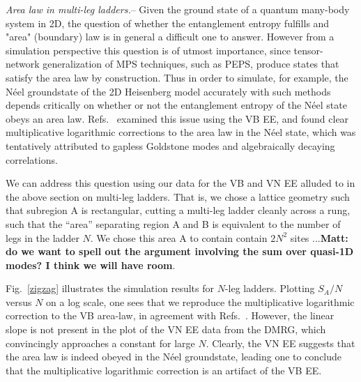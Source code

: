 \documentclass[prl,aps,twocolumn,floatfix,amsmath,amssymb,superscriptaddress,tightenlines]{revtex4}
\begin{document}
{\it Area law in multi-leg ladders.}--  Given the ground state of a
quantum many-body system in 2D, the question of whether the entanglement
entropy fulfills and "area" (boundary) law is in general a difficult one
to answer.  However from a simulation perspective this question is of
utmost importance, since tensor-network generalization of MPS techniques,
such as PEPS, produce states that satisfy the area law by construction.
Thus in order to simulate, for example, the N\'eel groundstate of the 2D
Heisenberg model accurately with such methods depends critically on
whether or not the entanglement entropy of the N\'eel state obeys an area
law.  Refs.~\cite{Alet,Chh} examined this issue using the VB EE, and found
clear multiplicative logarithmic corrections to the area law in the N\'eel
state, which was tentatively attributed to gapless Goldstone modes and
algebraically decaying correlations.  

We can address this question using our data for the VB and VN EE alluded
to in the above section on multi-leg ladders.  That is, we chose a lattice
geometry such that subregion A is rectangular, cutting a multi-leg ladder
cleanly across a rung, such that the ``area'' separating region A and B is
equivalent to the number of legs in the ladder $N$.  We chose this area A
to contain contain $2N^2$ sites ...{\bf Matt: do we want to spell out the
argument involving the sum over quasi-1D modes?  I think we will have
room}.

Fig.~\ref{zigzag} illustrates the simulation results for $N$-leg ladders.
Plotting $S_A/N$ versus $N$ on a log scale, one sees that we reproduce the
multiplicative logarithmic correction to the VB area-law, in agreement
with Refs.~\cite{Alet,Chh}.  However, the linear slope is not present in
the plot of the VN EE data from the DMRG, which convincingly approaches a
constant for large $N$.  Clearly, the VN EE suggests that the area law is
indeed obeyed in the N\'eel groundstate, leading one to conclude that the
multiplicative logarithmic correction is an artifact of the VB EE.

\end{document}
